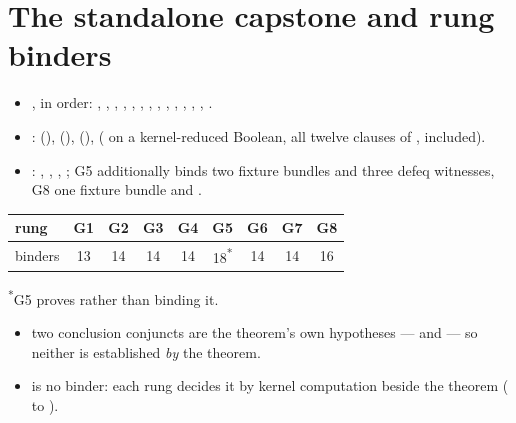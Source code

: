 \section{The standalone capstone and rung binders}
\label{sec:trust:binders}

\begin{itemize}
\item {}, in order: , , , ,
, , , , , , ,
, , .
\item {}:  (),
 (),  (),
 ( on a kernel-reduced Boolean, all twelve clauses of
,  included).
\item {}: , ,
, ; G5 additionally binds two fixture bundles and three defeq witnesses, G8
one fixture bundle and .
\end{itemize}

\par\smallskip\noindent
\small
\begin{tabular}{lcccccccc}
\toprule
rung & G1 & G2 & G3 & G4 & G5 & G6 & G7 & G8 \\
\midrule
binders & 13 & 14 & 14 & 14 & 18\textsuperscript{*} & 14 & 14 & 16 \\
\bottomrule
\end{tabular}
\normalsize
\par\noindent
\textsuperscript{*}G5 proves  rather than binding it.

\begin{itemize}
\item {} two conclusion conjuncts are the theorem's own hypotheses --- 
and  --- so neither is established \emph{by} the theorem.
\item {}  is no binder: each rung decides it by kernel
computation beside the theorem ( to ).
\end{itemize}

